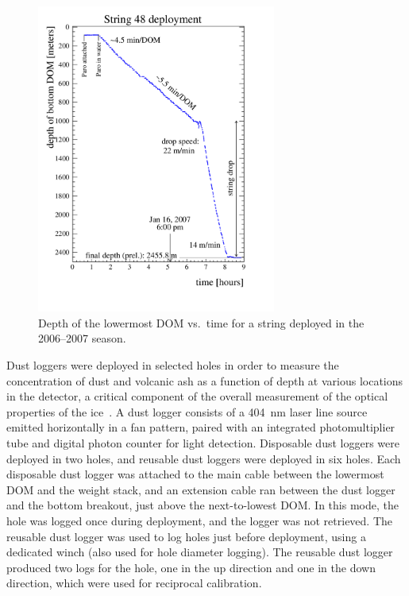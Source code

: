 \begin{figure}[!ht]
 \centering
 \includegraphics[width=0.70\textwidth]{graphics/drill/String48_deploy.pdf}
\caption{Depth of the lowermost DOM vs.~time for a string deployed in the
  2006--2007 season.}
\label{fig:deploytime}
\end{figure}

Dust loggers were deployed in selected holes in order to measure the
concentration of dust and volcanic ash as a function of depth at various
locations in the detector, a critical component of the overall measurement
of the optical properties of the
ice~\cite{Aartsen:2013rt,citeulike:2998650}. A dust logger consists of a 404~nm laser line source emitted horizontally in a
fan pattern, paired with an integrated
photomultiplier tube and digital photon counter for light
detection. Disposable dust loggers were deployed in two holes, and reusable dust loggers were
deployed in six holes. Each disposable dust
logger was attached to the main cable between the lowermost DOM and the
weight stack, and an extension cable ran between the dust logger and the
bottom breakout, just above the next-to-lowest DOM. In this mode, the hole
was logged once during deployment, and the logger was not
retrieved. The reusable dust logger was used to
log holes just before deployment, using a dedicated winch (also used for
hole diameter logging). The reusable dust logger produced two logs for the
hole, one in the up direction and one in the down direction, which were used for
reciprocal calibration.


